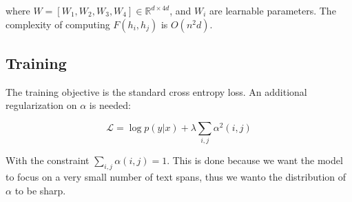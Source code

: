 where $W = [W_1, W_2, W_3, W_4] \in \mathbb{R}^{d \times 4d}$, and $W_i$ are
learnable parameters. The complexity of computing $F(h_i, h_j)$ is $O(n^2d)$.

\subsection{Training}

The training objective is the standard cross entropy loss. An additional
regularization on $\alpha$ is needed:

\begin{equation}
    \mathcal{L} = \log p(y|x) + \lambda \sum_{i, j} \alpha^2(i, j)
\end{equation}

With the constraint $\sum_{i, j} \alpha(i, j) = 1$.
This is done because we want the model to focus on a very small number of text
spans, thus we wanto the distribution of $\alpha$ to be sharp.
